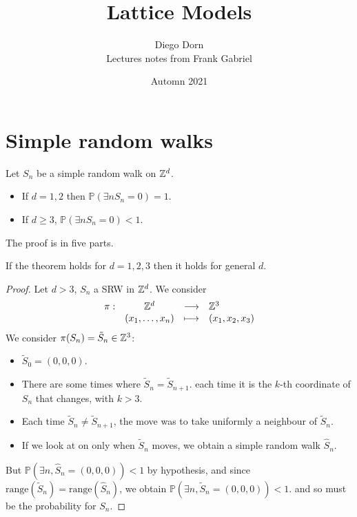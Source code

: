 


\title{Lattice Models}
\author{Diego Dorn \\ Lectures notes from Frank Gabriel}
\date{Automn 2021}

\newcommand{\Isom}{\mathrm{Isom}}
\newcommand{\Acts}{\curvearrowright}
\renewcommand{\P}[1]{\mathbb{P}\left(#1\right)}
\newcommand{\E}[1]{\mathbb{E}\left[#1\right]}


    \maketitle

    \section{Simple random walks}

    \begin{theorem}
        Let $S_n$ be a simple random walk on $\mathbb Z^d$.
        \begin{itemize}
            \item If $d = 1, 2$ then $\P{\exists n S_n = 0} = 1$.
            \item If $d \geq 3$, $\P{\exists n S_n = 0} < 1$.
        \end{itemize}
    \end{theorem}

    The proof is in five parts.

    \begin{claim}
        If the theorem holds for $d = 1, 2, 3$ then it holds for general $d$.
    \end{claim}
    \begin{proof}
        Let $d > 3$, $S_n$ a SRW in $\mathbb Z^d$.
        We consider \[
            \begin{array}{rccl} \pi : & \mathbb Z^d & \longrightarrow & \mathbb Z^3 \\ & (x_1, \dots, x_n) & \longmapsto & (x_1, x_2, x_3) \end{array}
        \]
        We consider $\pi(S_n) = \tilde{S}_n \in \mathbb Z^3$:
        \begin{itemize}
            \item $\tilde{S}_0 = (0, 0, 0)$.
            \item There are some times where $\tilde{S}_n = \tilde{S}_{n+1}$.
                each time it is the $k$-th coordinate of $S_n$ that changes, with $k > 3$.
            \item Each time $\tilde{S}_n \neq \tilde{S}_{n+1}$, 
                the move was to take uniformly a neighbour of $\tilde{S}_n$.
            \item If we look at on only when $\tilde{S}_n$ moves,
                we obtain a simple random walk $\hat{S}_n$.
        \end{itemize}
        But $\P{\exists n, \hat S_n = (0, 0, 0)} < 1$ by hypothesis, 
        and since $\mathrm{range}(\tilde S_n) = \mathrm{range}(\hat S_n)$,
        we obtain
        $\P{\exists n, \tilde S_n = (0, 0, 0)} < 1$.
        and so must be the probability for $S_n$.
    \end{proof}

